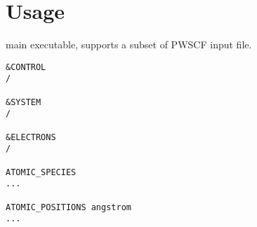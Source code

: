 \section{Usage}

\ffrLFDFT main executable, \ffrmain supports a subset of
PWSCF input file.

\begin{verbatim}
&CONTROL
/

&SYSTEM
/

&ELECTRONS
/

ATOMIC_SPECIES
...

ATOMIC_POSITIONS angstrom
...
\end{verbatim}


